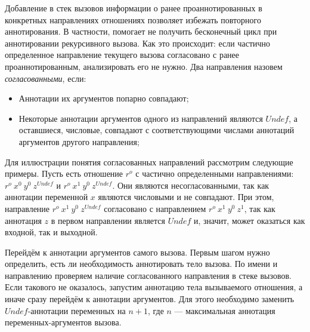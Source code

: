Добавление в стек вызовов информации о ранее проаннотированных в конкретных направлениях отношениях позволяет избежать повторного аннотирования.
В частности, помогает не получить бесконечный цикл при аннотировании рекурсивного вызова.
Как это происходит: если частично определенное направление текущего вызова согласовано с ранее проаннотированным, анализировать его не нужно.
Два направления назовем \emph{согласованными}, если:
\begin{itemize}
    \item Аннотации их аргументов попарно совпадают;
    \item Некоторые аннотации аргументов одного из направлений являются $Undef$, а оставшиеся, числовые, совпадают с соответствующими числами аннотаций аргументов другого направления;
\end{itemize}

Для иллюстрации понятия согласованных направлений рассмотрим следующие примеры. 
Пусть есть отношение $r^o$ с частично определенными направлениями: $r^o \ x^0 \ y^0 \ z^{Undef}$ и $r^o \ x^1 \ y^0 \ z^{Undef}$.
Они являются несогласованными, так как аннотации переменной $x$ являются числовыми и не совпадают.
При этом, направление $r^o \ x^1 \ y^0 \ z^{Undef}$ согласовано с направлением $r^o \ x^1 \ y^0 \ z^1$, так как аннотация $z$ в первом направлении является $Undef$ и, значит, может оказаться как входной, так и выходной.

Перейдём к аннотации аргументов самого вызова.
Первым шагом нужно определить, есть ли необходимость аннотировать тело вызова.
По имени и направлению проверяем наличие согласованного направления в стеке вызовов.
Если такового не оказалось, запустим аннотацию тела вызываемого отношения, а иначе сразу перейдём к аннотации аргументов.
Для этого необходимо заменить $Undef$-аннотации переменных на $n+1$, где $n$ --- максимальная аннотация переменных-аргументов вызова.
